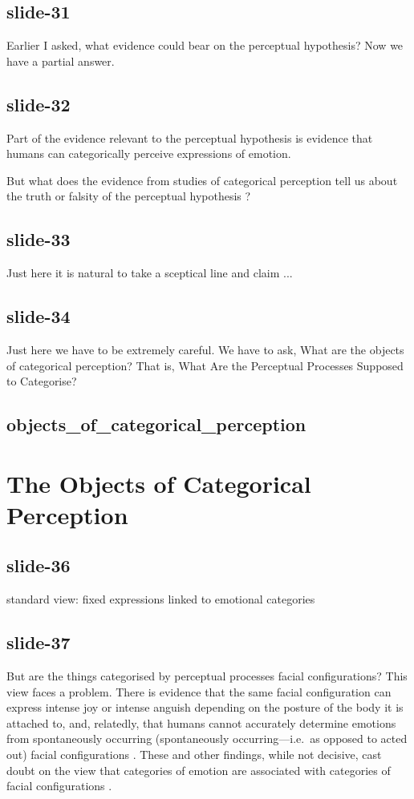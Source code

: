 \documentclass[12pt,\papersize]{extarticle}
\begin{document}
\subsection{slide-31}
Earlier I asked, what evidence could bear on the perceptual hypothesis?
Now we have a partial answer.

\subsection{slide-32}
Part of the evidence relevant to the perceptual hypothesis is evidence that
humans can categorically perceive expressions of emotion.

But what does the evidence from studies of categorical perception
tell us about the truth or falsity of the perceptual hypothesis ?

\subsection{slide-33}
Just here it is natural to take a sceptical line and claim ...

\subsection{slide-34}
Just here we have to be extremely careful.
We have to ask, What are the objects of categorical perception?
That is, What Are the Perceptual Processes Supposed to Categorise?

\subsection{objects\_of\_categorical\_perception}


\section{The Objects of Categorical Perception}

\subsection{slide-36}
standard view: fixed expressions linked to emotional categories

\subsection{slide-37}
But are the things categorised by perceptual processes facial configurations?
This view faces a problem.
There is evidence that
the same facial configuration can express intense joy or intense  anguish depending on the posture of the body it is attached to,
and, relatedly, that humans cannot accurately determine emotions from spontaneously occurring
(spontaneously occurring---i.e.\ as opposed to acted out)
facial configurations \citep{motley:1988_facial,aviezer:2008_angry,aviezer:2012_body}.
These and other findings, while not decisive, cast doubt on the view that categories of emotion are associated with categories of facial configurations \citep{hassin:2013_inherently}.
\end{document}
